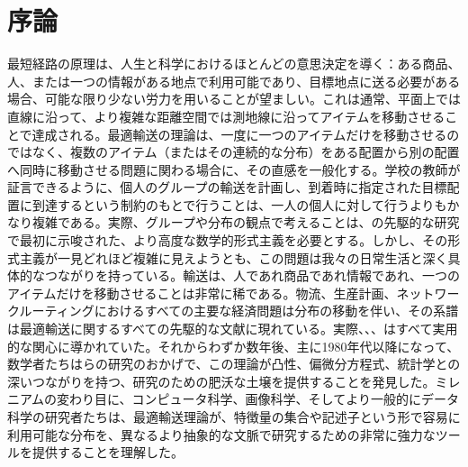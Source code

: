 
\chapter{序論}
\label{c-intro} %



%
%
%
%
%

最短経路の原理は、人生と科学におけるほとんどの意思決定を導く：ある商品、人、または一つの情報がある地点で利用可能であり、目標地点に送る必要がある場合、可能な限り少ない労力を用いることが望ましい。これは通常、平面上では直線に沿って、より複雑な距離空間では測地線に沿ってアイテムを移動させることで達成される。最適輸送の理論は、一度に一つのアイテムだけを移動させるのではなく、複数のアイテム（またはその連続的な分布）をある配置から別の配置へ同時に移動させる問題に関わる場合に、その直感を一般化する。学校の教師が証言できるように、個人のグループの輸送を計画し、到着時に指定された目標配置に到達するという制約のもとで行うことは、一人の個人に対して行うよりもかなり複雑である。実際、グループや分布の観点で考えることは、\citet{Monge1781}の先駆的な研究で最初に示唆された、より高度な数学的形式主義を必要とする。しかし、その形式主義が一見どれほど複雑に見えようとも、この問題は我々の日常生活と深く具体的なつながりを持っている。輸送は、人であれ商品であれ情報であれ、一つのアイテムだけを移動させることは非常に稀である。物流、生産計画、ネットワークルーティングにおけるすべての主要な経済問題は分布の移動を伴い、その系譜は最適輸送に関するすべての先駆的な文献に現れている。実際、\citet{tolstoi1930methods}、\citet{Hitchcock41}、\citet{Kantorovich42}はすべて実用的な関心に導かれていた。それからわずか数年後、主に1980年代以降になって、数学者たちは\citet{Brenier91}らの研究のおかげで、この理論が凸性、偏微分方程式、統計学との深いつながりを持つ、研究のための肥沃な土壌を提供することを発見した。ミレニアムの変わり目に、コンピュータ科学、画像科学、そしてより一般的にデータ科学の研究者たちは、最適輸送理論が、特徴量の集合や記述子という形で容易に利用可能な分布を、異なるより抽象的な文脈で研究するための非常に強力なツールを提供することを理解した。
%

